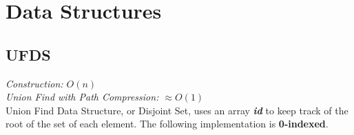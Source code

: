\documentclass[../hackpack.tex]{subfiles}
\begin{document}
\section{Data Structures}

\subsection{UFDS}
\textit{Construction: $O(n)$} 
\\ 
\textit{Union Find with Path Compression: $\approx O(1)$}
\\
Union Find Data Structure, or Disjoint Set, uses an array \textit{\textbf{id}} to keep track of the root of the set of each element.
The following implementation is \textbf{0-indexed}.

\end{document}
